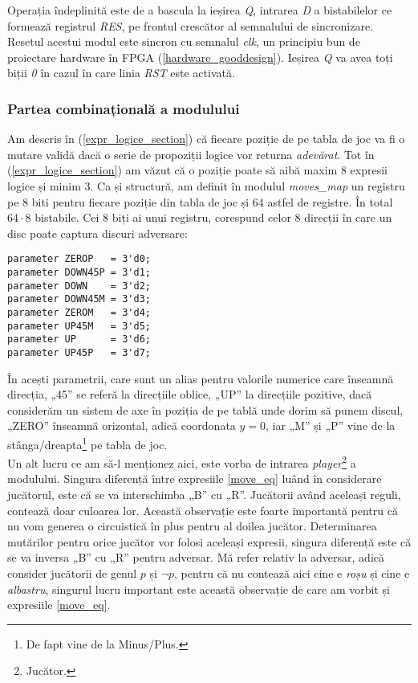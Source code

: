 \documentclass[12pt,twoside,a4paper,fleqn]{book}
\theoremstyle{definition}
\begin{document}
Operația îndeplinită este de a bascula la ieșirea \emph{Q}, intrarea \emph{D} a bistabilelor ce formează registrul \emph{RES}, pe frontul crescător al semnalului de sincronizare. Resetul acestui modul este sincron cu semnalul \emph{clk}, un principiu bun de proiectare hardware în FPGA (\ref{hardware_gooddesign}). Ieșirea \emph{Q} va avea toți biții \emph{0} în cazul în care linia \emph{RST} este activată.
\subsubsection{Partea combinațională a modulului}
Am descris în (\ref{expr_logice_section}) că fiecare poziție de pe tabla de joc va fi o mutare validă dacă o serie de propoziții logice vor returna \emph{adevărat}. Tot în (\ref{expr_logice_section}) am văzut că o poziție poate să aibă maxim $8$ expresii logice și minim $3$. Ca și structură, am definit în modulul \emph{moves\_map} un registru pe $8$ biti pentru fiecare poziție din tabla de joc și $64$ astfel de registre. În total $64 \cdot 8$ bistabile. Cei $8$ biți ai unui registru, corespund celor 8 direcții în care un disc poate captura discuri adversare:
\begin{verbatim}
parameter ZEROP   = 3'd0;
parameter DOWN45P = 3'd1;
parameter DOWN    = 3'd2;
parameter DOWN45M = 3'd3;
parameter ZEROM   = 3'd4;
parameter UP45M   = 3'd5;
parameter UP      = 3'd6;
parameter UP45P   = 3'd7;
\end{verbatim}
În acești parametrii, care sunt un alias pentru valorile numerice care înseamnă direcția, „45” se referă la direcțiile oblice, „UP” la direcțiile pozitive, dacă considerăm un sistem de axe în poziția de pe tablă unde dorim să punem discul, „ZERO” înseamnă orizontal, adică coordonata $y=0$, iar „M” și „P” vine de la stânga/dreapta\footnote{De fapt vine de la Minus/Plus.} pe tabla de joc.\\
Un alt lucru ce am să-l menționez aici, este vorba de intrarea \emph{player}\footnote{Jucător.} a modulului. Singura diferență între expresiile \eqref{move_eq} luând în considerare jucătorul, este că se va interschimba „B” cu „R”. Jucătorii având aceleași reguli, contează doar culoarea lor. Această observație este foarte importantă pentru că nu vom generea o circuistică în plus pentru al doilea jucător. Determinarea mutărilor pentru orice jucător vor folosi aceleași expresii, singura diferență este că se va inversa „B” cu „R” pentru adversar. Mă refer relativ la adversar, adică consider jucătorii de genul $p$ și $\lnot p$, pentru că nu contează aici cine e \emph{roșu} și cine e \emph{albastru}, singurul lucru important este această observație de care am vorbit și expresiile \eqref{move_eq}.\\
\end{document}
